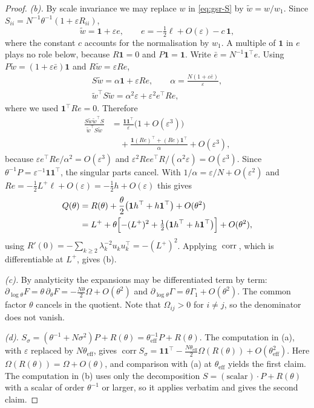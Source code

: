 \begin{proof}
\emph{(b).} By scale invariance we may replace $w$ in \eqref{eq:gsr-S} by
$\tilde w=w/w_1$. Since $S_{ii}=N^{-1}\theta^{-1}(1+\varepsilon R_{ii})$,
\[
  \tilde w=\mathbf 1+\varepsilon e,\qquad e=-\tfrac12\ell+O(\varepsilon)-c\,\mathbf 1,
\]
where the constant $c$ accounts for the normalisation by $w_1$. A multiple of $\mathbf 1$ in $e$
plays no role below, because $R\mathbf 1=0$ and $P\mathbf 1=\mathbf 1$. Write $\bar e=N^{-1}\mathbf 1^{\top}e$.
Using $P\tilde w=(1+\varepsilon\bar e)\mathbf 1$ and $R\tilde w=\varepsilon Re$,
\begin{gather*}
  S\tilde w=\alpha\mathbf 1+\varepsilon Re,\qquad
  \alpha=\frac{N(1+\varepsilon\bar e)}{\varepsilon},\\
  \tilde w^{\top}S\tilde w=\alpha^{2}\varepsilon+\varepsilon^{2}e^{\top}Re,
\end{gather*}
where we used $\mathbf 1^{\top}Re=0$. Therefore
\begin{align*}
  \frac{S\tilde w\tilde w^{\top}S}{\tilde w^{\top}S\tilde w}
  &=\frac{\mathbf 1\mathbf 1^{\top}}{\varepsilon}\bigl(1+O(\varepsilon^{3})\bigr)\\
  &\quad+\frac{\mathbf 1(Re)^{\top}+(Re)\mathbf 1^{\top}}{\alpha}+O(\varepsilon^{3}),
\end{align*}
because $\varepsilon e^{\top}Re/\alpha^{2}=O(\varepsilon^{3})$ and
$\varepsilon^{2}Ree^{\top}R/(\alpha^{2}\varepsilon)=O(\varepsilon^{3})$. Since
$\theta^{-1}P=\varepsilon^{-1}\mathbf 1\mathbf 1^{\top}$, the singular parts cancel. With
$1/\alpha=\varepsilon/N+O(\varepsilon^{2})$ and $Re=-\tfrac12L^{+}\ell+O(\varepsilon)=-\tfrac12h+O(\varepsilon)$
this gives
\begin{align*}
  Q(\theta)&=R(\theta)+\frac{\theta}{2}\bigl(\mathbf 1h^{\top}+h\mathbf 1^{\top}\bigr)+O(\theta^{2})\\
  &=L^{+}+\theta\Bigl[-(L^{+})^{2}+\tfrac12\bigl(\mathbf 1h^{\top}+h\mathbf 1^{\top}\bigr)\Bigr]+O(\theta^{2}),
\end{align*}
using $R'(0)=-\sum_{k\ge2}\lambda_k^{-2}u_ku_k^{\top}=-(L^{+})^{2}$. Applying $\operatorname{corr}$, which is
differentiable at $L^{+}$, gives (b).

\emph{(c).} By analyticity the expansions may be differentiated term by term:
$\partial_{\log\theta}F=\theta\,\partial_\theta F=-\tfrac{N\theta}{2}\Omega+O(\theta^{2})$ and
$\partial_{\log\theta}\Gamma=\theta \Gamma_1+O(\theta^{2})$. The common factor $\theta$ cancels in the
quotient. Note that $\Omega_{ij}>0$ for $i\neq j$, so the denominator does not vanish.

\emph{(d).} $S_\sigma=(\theta^{-1}+N\sigma^{2})P+R(\theta)=\theta_{\mathrm{eff}}^{-1}P+R(\theta)$. The
computation in (a), with $\varepsilon$ replaced by $N\theta_{\mathrm{eff}}$, gives
$\operatorname{corr}S_\sigma=\mathbf 1\mathbf 1^{\top}-\tfrac{N\theta_{\mathrm{eff}}}{2}\Omega(R(\theta))+O(\theta_{\mathrm{eff}}^{2})$.
Here $\Omega(R(\theta))=\Omega+O(\theta)$, and comparison with (a) at $\theta_{\mathrm{eff}}$ yields the
first claim. The computation in (b) uses only the decomposition
$S=(\text{scalar})\cdot P+R(\theta)$ with a scalar of order $\theta^{-1}$ or larger, so it applies verbatim
and gives the second claim.
\end{proof}

